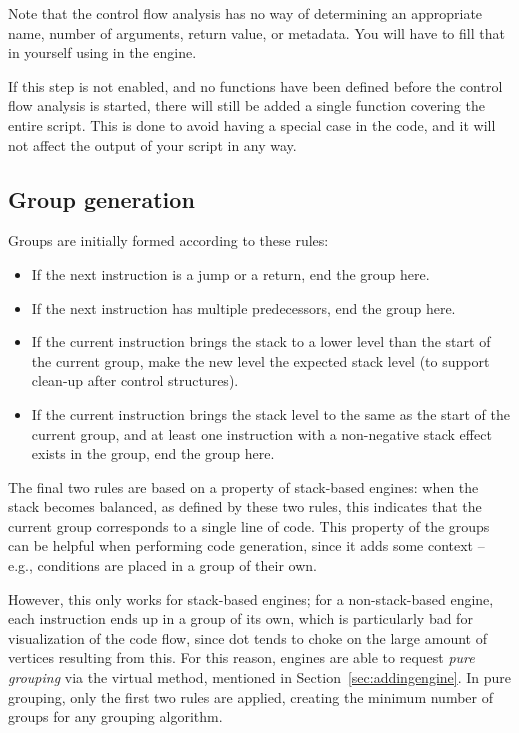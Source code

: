 Note that the control flow analysis has no way of determining an appropriate name, number of arguments, return value, or metadata. You will have to fill that in yourself using  in the engine.

If this step is not enabled, and no functions have been defined before the control flow analysis is started, there will still be added a single function covering the entire script. This is done to avoid having a special case in the code, and it will not affect the output of your script in any way.

\subsection{Group generation}
\label{sec:groupgen}
Groups are initially formed according to these rules:
\begin{itemize}
\item If the next instruction is a jump or a return, end the group here.
\item If the next instruction has multiple predecessors, end the group here.
\item If the current instruction brings the stack to a lower level than the start of the current group, make the new level the expected stack level (to support clean-up after control structures).
\item If the current instruction brings the stack level to the same as the start of the current group, and at least one instruction with a non-negative stack effect exists in the group, end the group here.
\end{itemize}

The final two rules are based on a property of stack-based engines: when the stack becomes balanced, as defined by these two rules, this indicates that the current group corresponds to a single line of code. This property of the groups can be helpful when performing code generation, since it adds some context -- e.g., conditions are placed in a group of their own.

However, this only works for stack-based engines; for a non-stack-based engine, each instruction ends up in a group of its own, which is particularly bad for visualization of the code flow, since dot tends to choke on the large amount of vertices resulting from this. For this reason, engines are able to request \emph{pure grouping} via the virtual  method, mentioned in Section~\vref{sec:addingengine}. In pure grouping, only the first two rules are applied, creating the minimum number of groups for any grouping algorithm.

